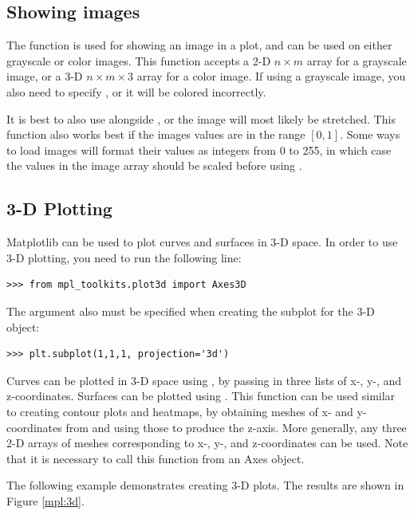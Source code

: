 \subsection*{Showing images}
The function  is used for showing an image in a plot, and can be used on either grayscale or color images.
This function accepts a 2-D $n\times m$ array for a grayscale image, or a 3-D $n\times m \times 3$ array for a color image.
If using a grayscale image, you also need to specify , or it will be colored incorrectly.

It is best to also use  alongside , or the image will most likely be stretched.
This function also works best if the images values are in the range $[0,1]$.
Some ways to load images will format their values as integers from 0 to 255, in which case the values in the image array should be scaled before using .

\subsection*{3-D Plotting}
Matplotlib can be used to plot curves and surfaces in 3-D space.
In order to use 3-D plotting, you need to run the following line:
\begin{lstlisting}
>>> from mpl_toolkits.plot3d import Axes3D
\end{lstlisting}
The argument  also must be specified when creating the subplot for the 3-D object:
\begin{lstlisting}
>>> plt.subplot(1,1,1, projection='3d')
\end{lstlisting}

Curves can be plotted in 3-D space using , by passing in three lists of x-, y-, and z-coordinates.
Surfaces can be plotted using .
This function can be used similar to creating contour plots and heatmaps, by obtaining meshes of x- and y- coordinates from  and using those to produce the z-axis.
More generally, any three 2-D arrays of meshes corresponding to x-, y-, and z-coordinates can be used.
Note that it is necessary to call this function from an Axes object.

The following example demonstrates creating 3-D plots. The results are shown in Figure \ref{mpl:3d}.

